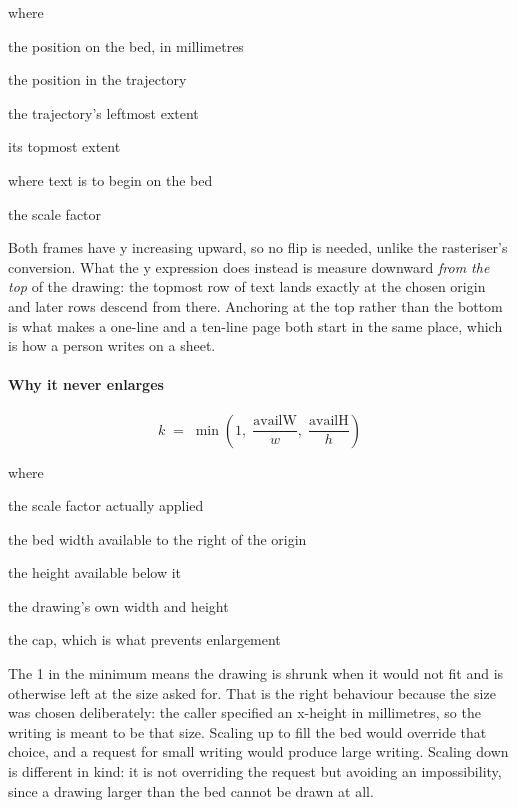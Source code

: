 \noindent where
\begin{description}[leftmargin=2.4em,style=nextline,font=\normalfont\ttfamily]\setlength\itemsep{1pt}
  \item[{$x_{\mathrm{bed}},\, y_{\mathrm{bed}}$}] \normalfont the position on the bed, in millimetres
  \item[{$x,\,y$}] \normalfont the position in the trajectory
  \item[{$x_0$}] \normalfont the trajectory's leftmost extent
  \item[{$y_1$}] \normalfont its topmost extent
  \item[{$\mathrm{originX},\, \mathrm{originY}$}] \normalfont where text is to begin on the bed
  \item[{$k$}] \normalfont the scale factor
\end{description}
Both frames have y increasing upward, so no flip is needed, unlike the rasteriser's conversion. What the y expression does instead is measure downward \emph{from the top} of the drawing: the topmost row of text lands exactly at the chosen origin and later rows descend from there. Anchoring at the top rather than the bottom is what makes a one-line and a ten-line page both start in the same place, which is how a person writes on a sheet.


\paragraph{Why it never enlarges}

\begin{equation}
k \;=\; \min\!\left(1,\; \frac{\mathrm{availW}}{w},\; \frac{\mathrm{availH}}{h}\right)
\end{equation}

\noindent where
\begin{description}[leftmargin=2.4em,style=nextline,font=\normalfont\ttfamily]\setlength\itemsep{1pt}
  \item[{$k$}] \normalfont the scale factor actually applied
  \item[{$\mathrm{availW}$}] \normalfont the bed width available to the right of the origin
  \item[{$\mathrm{availH}$}] \normalfont the height available below it
  \item[{$w,\,h$}] \normalfont the drawing's own width and height
  \item[{$1$}] \normalfont the cap, which is what prevents enlargement
\end{description}
The 1 in the minimum means the drawing is shrunk when it would not fit and is otherwise left at the size asked for. That is the right behaviour because the size was chosen deliberately: the caller specified an x-height in millimetres, so the writing is meant to be that size. Scaling up to fill the bed would override that choice, and a request for small writing would produce large writing. Scaling down is different in kind: it is not overriding the request but avoiding an impossibility, since a drawing larger than the bed cannot be drawn at all.


